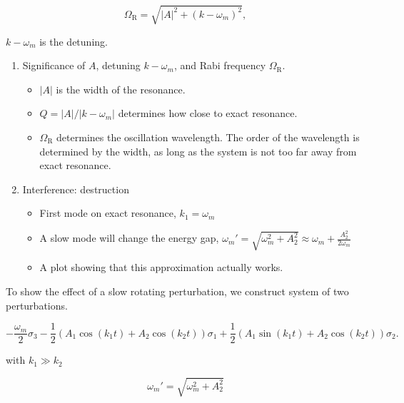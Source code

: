 \documentclass[%
preprint,
 amsmath,amssymb,
 aps,
]{revtex4-1}
\begin{document}
\begin{equation}
\Omega_{\mathrm R} = \sqrt{ \lvert A\rvert^2 + (k - \omega_m)^2 },
\end{equation}

$k - \omega_m$ is the detuning.




\begin{enumerate}
    \item Significance of $A$, detuning $k - \omega_m$, and Rabi frequency $\Omega_{\mathrm R}$.
        \begin{itemize}
            \item $\lvert A \rvert$ is the width of the resonance.
            \item $Q = \lvert A\rvert/\lvert k - \omega_m \rvert$ determines how close to exact resonance.
            \item $\Omega_{\mathrm R}$ determines the oscillation wavelength. The order of the wavelength is determined by the width, as long as the system is not too far away from exact resonance.
        \end{itemize}
    \item Interference: destruction
        \begin{itemize}
            \item First mode on exact resonance,  $k_1 = \omega_m$
            \item A slow mode will change the energy gap, $\omega_m' = \sqrt{\omega_m^2 + A_2^2} \approx \omega_m + \frac{A_2^2}{2\omega_m}$
            \item A plot showing that this approximation actually works.
        \end{itemize}
\end{enumerate}




To show the effect of a slow rotating perturbation, we construct system of two perturbations.

\begin{equation}
-\frac{\omega_m}{2} \sigma_3 - \frac{1}{2} \left(A_1 \cos(k_1 t) + A_2 \cos(k_2t) \right) \sigma_1 + \frac{1}{2} \left( A_1 \sin (k_1t) + A_2 \cos(k_2t) \right) \sigma_2.
\end{equation}

with $k_1 \gg k_2$

\begin{equation}
\omega_m' = \sqrt{\omega_m^2 + A_2^2}
\end{equation}
\end{document}
